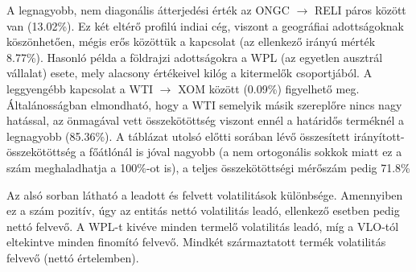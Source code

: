 \documentclass[12pt,bibliography=totoc]{article}
\begin{document}
A legnagyobb, nem diagonális átterjedési érték az ONGC $\rightarrow$ RELI páros között van (13.02\%). Ez két eltérő profilú indiai cég, viszont a geográfiai adottságoknak köszönhetően, mégis erős közöttük a kapcsolat (az ellenkező irányú mérték 8.77\%). Hasonló példa a földrajzi adottságokra a WPL (az egyetlen ausztrál vállalat) esete, mely alacsony értékeivel kilóg a kitermelők csoportjából. A leggyengébb kapcsolat a WTI $\rightarrow$ XOM között (0.09\%) figyelhető meg. Általánosságban elmondható, hogy a WTI semelyik másik szereplőre nincs nagy hatással, az önmagával vett összekötöttség viszont ennél a határidős terméknél a legnagyobb (85.36\%).
A táblázat utolsó előtti sorában lévő összesített irányított-összekötöttség a főátlónál is jóval nagyobb (a nem ortogonális sokkok miatt ez a szám meghaladhatja a 100\%-ot is), a teljes összekötöttségi mérőszám pedig 71.8\%

Az alsó sorban látható a leadott és felvett volatilitások különbsége. Amennyiben ez a szám pozitív, úgy az entitás nettó volatilitás leadó, ellenkező esetben pedig nettó felvevő. A WPL-t kivéve minden termelő volatilitás leadó, míg a VLO-tól eltekintve minden finomító felvevő. Mindkét származtatott termék volatilitás felvevő (nettó értelemben).


\end{document}

